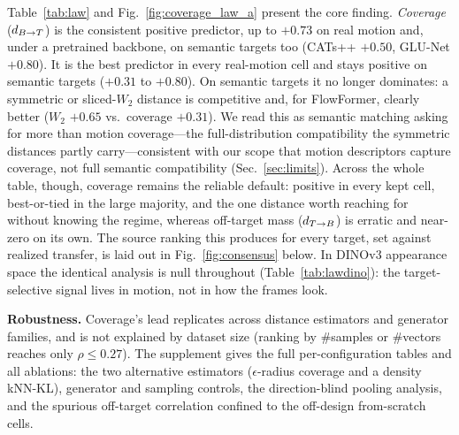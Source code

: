 \begin{table}[!tb]
\centering
\caption{\textbf{The identical analysis in appearance (DINO) space: the
negative control for Table~\ref{tab:law}.} No DINO distance---directed,
symmetric, or W2---is a usable positive predictor: every cell is
null-to-wrong-signed, and no coverage-family appearance distance reaches a useful
positive value. Whatever predicts transfer lives in motion, not in how the frames
look. Regimes, columns, and stratification as in Table~\ref{tab:law}; ``--''
marks RAFT on semantic targets.}
\label{tab:lawdino}
\footnotesize
\setlength{\tabcolsep}{4pt}

\end{table}

Table~\ref{tab:law} and Fig.~\ref{fig:coverage_law_a} present the core finding.
\emph{Coverage} ($d_{B\to T}$) is the consistent positive predictor, up to $+0.73$ on
real motion and, under a pretrained backbone, on semantic targets too (CATs++
$+0.50$, GLU-Net $+0.80$). It is the best
predictor in every real-motion cell and stays positive on semantic targets
($+0.31$ to $+0.80$). On semantic targets it no longer dominates: a symmetric or
sliced-$W_2$ distance is competitive and, for FlowFormer, clearly better ($W_2$
$+0.65$ vs.\ coverage $+0.31$). We read this as semantic matching asking for more
than motion coverage---the full-distribution compatibility the symmetric distances
partly carry---consistent with our scope that motion descriptors capture coverage,
not full semantic compatibility (Sec.~\ref{sec:limits}). Across the whole table,
though, coverage remains the reliable default: positive in every kept cell,
best-or-tied in the large majority, and the one distance worth reaching for without
knowing the regime, whereas off-target mass ($d_{T\to B}$) is erratic and near-zero on
its own. The source
ranking this produces for every target, set against realized transfer, is laid
out in Fig.~\ref{fig:consensus} below. In DINOv3 appearance space the identical
analysis is null throughout (Table~\ref{tab:lawdino}): the target-selective signal
lives in motion, not in how the frames look.


\noindent\textbf{Robustness.} Coverage's lead replicates across distance
estimators and generator families, and is not explained by dataset size (ranking
by \#samples or \#vectors reaches only $\rho\le0.27$). The supplement gives the
full per-configuration tables and all ablations: the two alternative estimators
($\epsilon$-radius coverage and a density kNN-KL), generator and sampling
controls, the direction-blind pooling analysis, and the spurious off-target
correlation confined to the off-design from-scratch cells.

